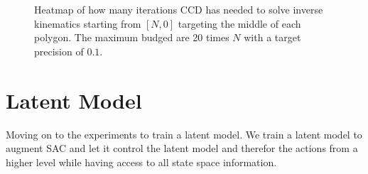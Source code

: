 \begin{figure}
    \begin{center}
        \hfill
        \hfill
    \end{center}
    \caption[CCD iteration heatmap]{Heatmap of how many iterations CCD has needed to solve inverse kinematics starting from $[N, 0]$ targeting the middle of each polygon. The maximum budged are 20 times $N$ with a target precision of $0.1$.}
    \label{fig:SAC_baseline_min_distance_step}
\end{figure}

\section{Latent Model}

Moving on to the experiments to train a latent model. We train a latent model to augment SAC and let it control the latent model and therefor the actions from a higher level while having access to all state space information.

